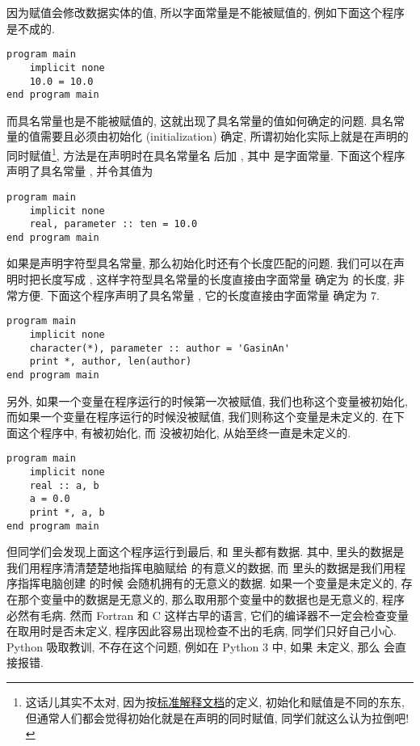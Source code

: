 因为赋值会修改数据实体的值, 所以字面常量是不能被赋值的, 例如下面这个程序是不成的.
\begin{lstlisting}
program main
    implicit none
    10.0 = 10.0
end program main
\end{lstlisting}
而具名常量也是不能被赋值的, 这就出现了具名常量的值如何确定的问题. 具名常量的值需要且必须由初始化 (initialization) 确定, 所谓初始化实际上就是在声明的同时赋值\footnote{这话儿其实不太对, 因为按\href{https://j3-fortran.org/doc/year/24/24-007.pdf}{标准解释文档}的定义, 初始化和赋值是不同的东东, 但通常人们都会觉得初始化就是在声明的同时赋值, 同学们就这么认为拉倒吧!}, 方法是在声明时在具名常量名 \ttt{[name]} 后加 \ttt{ = [value]}, 其中 \ttt{[value]} 是字面常量. 下面这个程序声明了具名常量 , 并令其值为 
\begin{lstlisting}
program main
    implicit none
    real, parameter :: ten = 10.0
end program main
\end{lstlisting}
如果是声明字符型具名常量, 那么初始化时还有个长度匹配的问题. 我们可以在声明时把长度写成 \ttt{*}, 这样字符型具名常量的长度直接由字面常量 \ttt{[value]} 确定为 \ttt{[value]} 的长度, 非常方便. 下面这个程序声明了具名常量 , 它的长度直接由字面常量  确定为 $7$.
\begin{lstlisting}
program main
    implicit none
    character(*), parameter :: author = 'GasinAn'
    print *, author, len(author)
end program main
\end{lstlisting}
另外, 如果一个变量在程序运行的时候第一次被赋值, 我们也称这个变量被初始化, 而如果一个变量在程序运行的时候没被赋值, 我们则称这个变量是未定义的. 在下面这个程序中,  有被初始化, 而  没被初始化, 从始至终一直是未定义的.
\begin{lstlisting}
program main
    implicit none
    real :: a, b
    a = 0.0
    print *, a, b
end program main
\end{lstlisting}
但同学们会发现上面这个程序运行到最后,  和  里头都有数据. 其中,  里头的数据是我们用程序清清楚楚地指挥电脑赋给  的有意义的数据, 而  里头的数据是我们用程序指挥电脑创建  的时候  会随机拥有的无意义的数据. 如果一个变量是未定义的, 存在那个变量中的数据是无意义的, 那么取用那个变量中的数据也是无意义的, 程序必然有毛病. 然而 Fortran 和 C 这样古早的语言, 它们的编译器不一定会检查变量在取用时是否未定义, 程序因此容易出现检查不出的毛病, 同学们只好自己小心. Python 吸取教训, 不存在这个问题, 例如在 Python 3 中, 如果  未定义, 那么  会直接报错.

